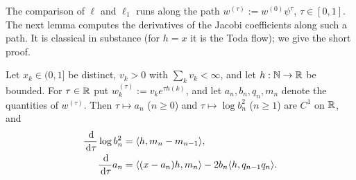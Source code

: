 The comparison of $\ell$ and $\ell_1$ runs along the path $w^{(\tau)}:=w^{(0)}\psi^\tau$, $\tau\in[0,1]$. The next lemma
computes the derivatives of the Jacobi coefficients along such a path. It is classical in substance (for $h=x$ it is
the Toda flow); we give the short proof.

\begin{lemma}\label{lem:first-variation}
Let $x_k\in(0,1]$ be distinct, $v_k>0$ with $\sum_kv_k<\infty$, and let $h:\mathbb{N}\to\mathbb{R}$ be bounded. For $\tau\in\mathbb{R}$ put
$w^{(\tau)}_k:=v_ke^{\tau h(k)}$, and let $a_n,b_n,q_n,m_n$ denote the quantities of $w^{(\tau)}$. Then
$\tau\mapsto a_n$ ($n\ge0$) and $\tau\mapsto\log b_n^2$ ($n\ge1$) are $C^1$ on $\mathbb{R}$, and
\begin{align}
  \frac{\,\mathrm{d}}{\,\mathrm{d}\tau}\log b_n^2&=\langle h,m_n-m_{n-1}\rangle, \label{eq:fv-b}\\
  \frac{\,\mathrm{d}}{\,\mathrm{d}\tau}a_n&=\langle(x-a_n)h,m_n\rangle-2b_n\langle h,q_{n-1}q_n\rangle. \label{eq:fv-a}
\end{align}
\end{lemma}

